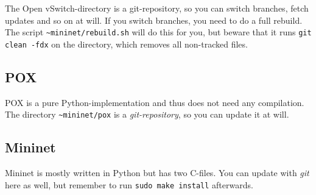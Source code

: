 The Open vSwitch-directory is a git-repository, so you can switch branches,
fetch updates and so on at will. If you switch
branches, you need to do a full rebuild. The script
\texttt{\~{}mininet/rebuild.sh} will do this for you, but beware that it
runs \texttt{git clean -fdx} on the directory, which removes all non-tracked
files.

\subsection{POX}

POX is a pure Python-implementation and thus does not need any
compilation.  The directory \texttt{\~{}mininet/pox} is a
\textit{git-repository}, so you can update it at will.

\subsection{Mininet}

Mininet is mostly written in Python but has two C-files. You can update with
\textit{git} here as well, but remember to run \texttt{sudo make install}
afterwards.
